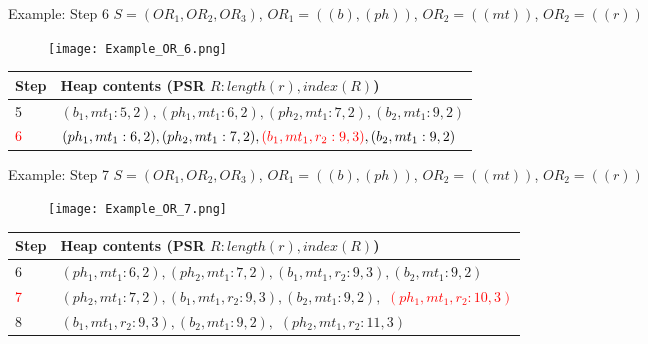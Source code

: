 \begin{frame}[noframenumbering]{Example: Step 6}
	$S = (OR_1, OR_2, OR_3)$, $OR_1 = ((b), (ph))$, $OR_2 = ((mt))$, $OR_2 = ((r))$
	
	\begin{figure}[h]
		\texttt{[image: Example\_OR\_6.png]}
	\end{figure}
	
	\begin{table}[h]
		\centering
		\begin{tabular}{ |l|p{10cm}| } 
			\hline
			Step & Heap contents (PSR $R : length(r), index(R)$) \\
			\hline
			5 & $(b_1, mt_1 : 5, 2), (ph_1, mt_1 : 6, 2), (ph_2, mt_1 : 7, 2), (b_2, mt_1 : 9, 2)$ \\ 
			\hline
			\textcolor{red}{6} & $(ph_1, mt_1 : 6, 2), (ph_2, mt_1 : 7, 2), \textcolor{red}{(b_1, mt_1, r_2 : 9, 3)}, (b_2, mt_1 : 9, 2)$ \\ 
			\hline
		\end{tabular}
	\end{table}

\end{frame}

\begin{frame}[noframenumbering]{Example: Step 7}
	$S = (OR_1, OR_2, OR_3)$, $OR_1 = ((b), (ph))$, $OR_2 = ((mt))$, $OR_2 = ((r))$
	
	\begin{figure}[H]
		\texttt{[image: Example\_OR\_7.png]}
	\end{figure}
	
	\begin{table}[H]
		\centering
		\begin{tabular}{ |l|p{10cm}| } 
			\hline
			Step & Heap contents (PSR $R : length(r), index(R)$) \\
			\hline
			6 & $(ph_1, mt_1 : 6, 2), (ph_2, mt_1 : 7, 2), (b_1, mt_1, r_2 : 9, 3), (b_2, mt_1 : 9, 2)$ \\ 
			\hline
			\textcolor{red}{7} & $(ph_2, mt_1 : 7, 2), (b_1, mt_1, r_2 : 9, 3), (b_2, mt_1 : 9, 2),$ \textcolor{red}{\st{$(ph_1, mt_1, r_2 : 10, 3)$}} \\ 
			\hline
			8 & $(b_1, mt_1, r_2 : 9, 3), (b_2, mt_1 : 9, 2),$ \st{$(ph_2, mt_1, r_2 : 11, 3)$} \\ 
			\hline
		\end{tabular}
	\end{table}

\end{frame}

